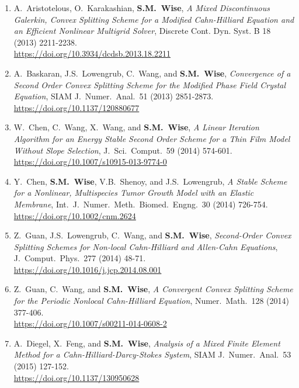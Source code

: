 \documentclass[11pt]{letter}
\begin{document}
\begin{enumerate}
	\item
A.~Aristotelous, O.~Karakashian, \textbf{S.M.~Wise}, {\sl A Mixed Discontinuous Galerkin, Convex Splitting Scheme for a Modified Cahn-Hilliard Equation and an Efficient Nonlinear Multigrid Solver}, Discrete Cont. Dyn. Syst. B 18 (2013) 2211-2238.
	\\
\url{https://doi.org/10.3934/dcdsb.2013.18.2211}

    \item
A.~Baskaran, J.S.~Lowengrub, C.~Wang, and \textbf{S.M.~Wise}, {\sl Convergence of a Second Order Convex Splitting Scheme for the Modified Phase Field Crystal Equation}, SIAM J.~Numer.~Anal.~51 (2013) 2851-2873.
	\\
\url{https://doi.org/10.1137/120880677}

    \item
W.~Chen, C.~Wang, X.~Wang, and \textbf{S.M.~Wise}, {\sl A Linear Iteration Algorithm for an Energy Stable Second Order Scheme for a Thin Film Model Without Slope Selection}, J.~Sci.~Comput.~59 (2014) 574-601.
	\\
\url{https://doi.org/10.1007/s10915-013-9774-0}

    \item
Y.~Chen, \textbf{S.M.~Wise}, V.B.~Shenoy, and J.S.~Lowengrub, {\sl A Stable Scheme for a Nonlinear, Multispecies Tumor Growth Model with an Elastic Membrane}, Int.~J.~Numer.~Meth.~Biomed.~Engng.~30 (2014) 726-754.
	\\ 
\url{https://doi.org/10.1002/cnm.2624}

	\item
Z.~Guan, J.S.~Lowengrub, C.~Wang, and \textbf{S.M.~Wise}, {\sl Second-Order Convex Splitting Schemes for Non-local Cahn-Hilliard and Allen-Cahn Equations}, J.~Comput.~Phys.~277 (2014) 48-71.
	\\ 
\url{https://doi.org/10.1016/j.jcp.2014.08.001}

	\item
Z.~Guan, C.~Wang, and \textbf{S.M.~Wise}, {\sl A Convergent Convex Splitting Scheme for the Periodic Nonlocal Cahn-Hilliard Equation}, Numer.~Math.~128 (2014) 377-406.
	\\ 
\url{https://doi.org/10.1007/s00211-014-0608-2}

	\item
A.~Diegel, X.~Feng, and \textbf{S.M.~Wise}, {\sl Analysis of a Mixed Finite Element Method for a Cahn-Hilliard-Darcy-Stokes System}, SIAM J.~Numer.~Anal.~53 (2015) 127-152.
	\\ 
\url{https://doi.org/10.1137/130950628}


\end{enumerate}
\end{document}
